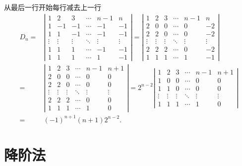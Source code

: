 \begin{solution}
    从最后一行开始每行减去上一行
$$
\begin{aligned}
D_{n}=&\left|\begin{array}{cccccc}
1 & 2 & 3 & \cdots & n-1 & n \\
1 & -1 & -1 & \cdots & -1 & -1 \\
1 & 1 & -1 & \cdots & -1 & -1 \\
\vdots & \vdots & \vdots & \ddots & \vdots & \vdots \\
1 & 1 & 1 & \cdots & -1 & -1\\
1 & 1 & 1 & \cdots & 1 & -1
\end{array}\right|=\left|\begin{array}{cccccc}
1 & 2 & 3 & \cdots & n-1 & n \\
2 & 0 & 0 & \cdots & 0 & -2 \\
2 & 2 & 0 & \cdots & 0 & -2 \\
\vdots & \vdots & \vdots & \ddots & \vdots & \vdots \\
2 & 2 & 2 & \cdots & 0 & -2 \\
1 & 1 & 1 & \cdots & 1 & -1
\end{array}\right| \\
=&\left|\begin{array}{cccccc}
1 & 2 & 3 & \cdots & n-1 & n+1 \\
2 & 0 & 0 & \cdots & 0 & 0 \\
2 & 2 & 0 & \cdots & 0 & 0 \\
\vdots & \vdots & \vdots & \ddots & \vdots & \vdots \\
2 & 2 & 2 & \cdots & 0 & 0 \\
1 & 1 & 1 & \cdots & 1 & 0
\end{array}\right|=2^{n-2}
\left|\begin{array}{cccccc}
1 & 2 & 3 & \cdots & n-1 & n+1 \\
1 & 0 & 0 & \cdots & 0 & 0 \\
1 & 1 & 0 & \cdots & 0 & 0 \\
\vdots & \vdots & \vdots & \ddots & \vdots & \vdots \\
1 & 1 & 1 & \cdots & 1 & 0
\end{array}\right|\\
=&(-1)^{n+1}(n+1) 2^{n-2} .
\end{aligned}
$$
\end{solution}

\section{降阶法}

